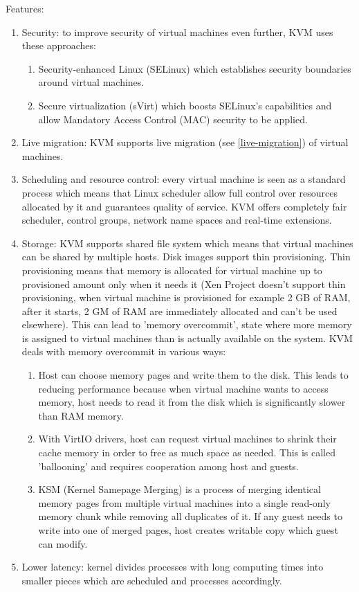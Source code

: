 Features:
\begin{enumerate}
\item Security: to improve security of virtual machines even further, KVM uses these approaches:
\begin{enumerate}
\item Security-enhanced Linux (SELinux) which establishes security boundaries around virtual machines.
\item Secure virtualization (sVirt) which boosts SELinux's capabilities and allow Mandatory Access Control (MAC) security to be applied.
\end{enumerate}
\item Live migration: KVM supports live migration (see \ref{live-migration}) of virtual machines.
\item Scheduling and resource control: every virtual machine is seen as a standard process which means that Linux scheduler allow full control over resources allocated by it and guarantees quality of service. KVM offers completely fair scheduler, control groups, network name spaces and real-time extensions.
\item Storage: KVM supports shared file system which means that virtual machines can be shared by multiple hosts. Disk images support thin provisioning. Thin provisioning means that memory is allocated for virtual machine up to provisioned amount only when it needs it (Xen Project doesn't support thin provisioning, when virtual machine is provisioned for example 2 GB of RAM, after it starts, 2 GM of RAM are immediately allocated and can't be used elsewhere). This can lead to 'memory overcommit', state where more memory is assigned to virtual machines than is actually available on the system. KVM deals with memory overcommit in various ways:
\begin{enumerate}
\item Host can choose memory pages and write them to the disk. This leads to reducing performance because when virtual machine wants to access memory, host needs to read it from the disk which is significantly slower than RAM memory.
\item With VirtIO drivers, host can request virtual machines to shrink their cache memory in order to free as much space as needed. This is called 'ballooning' and requires cooperation among host and guests.
\item KSM (Kernel Samepage Merging) is a process of merging identical memory pages from multiple virtual machines into a single read-only memory chunk while removing all duplicates of it. If any guest needs to write into one of merged pages, host creates writable copy which guest can modify.
\end{enumerate}
\item Lower latency: kernel divides processes with long computing times into smaller pieces which are scheduled and processes accordingly.
\end{enumerate}


